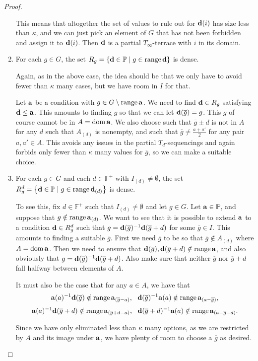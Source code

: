 \documentclass[12pt,a4paper]{article}
\newcommand{\F}{\mathbb{F}}
\DeclareMathOperator{\dom}{dom}
\DeclareMathOperator{\ran}{range}
\newcommand{\st}{\; | \;}
\newcommand{\set}[2]{\left\{#1\st #2 \right\}}
\renewcommand{\P}{\mathbb{P}}
\renewcommand{\a}{\textup{\textbf{a}}}
\newcommand{\g}{\overline{g}}
\renewcommand{\d}{\textup{\textbf{d}}}
\begin{document}
\begin{proof}
\begin{enumerate}
	This means that altogether the set of values to rule out for $\d(i)$ has size less than $\kappa$, and we can just pick an element of \(G\) that has not been forbidden and assign it to \(\d(i)\).
	Then \(\d\) is a partial \(T_\infty\)-terrace with \(i\) in its domain. 
	
	\item For each $g \in G$, the set $R_g=\set{\d \in \P}{g \in \ran \d }$ is dense. 
	
	Again, as in the above case, the idea should be that we only have to avoid fewer than $\kappa$ many cases, but we have room in $I$ for that.
	
	Let $\a$ be a condition with $g \in G \setminus \ran \a$. We need to find $\d \in R_g$ satisfying $\d \leq \a$. This amounts to finding $\g$ so that we can let $\d(\g)=g$.
	This $\g$ of course cannot be in $A=\dom \a$. We also choose such that $\g\pm d$ is not
	in $A$ for any $d$ such that $A_{(d)}$ is nonempty, and such that $\g \neq \frac{a+a'}{2}$ 
	for any pair $a,a'\in A$. This avoids any issues in the partial $T_d$-sequencings and again forbids only fewer than $\kappa$
	many values for $\g$, so we can make a suitable choice. 
		
	\item For each $g \in G$ and each $d \in \F^+$ with $I_{(d)}\neq \emptyset$, the set $R^d_g=\set{\d \in \P}{g \in \ran \d_{(d)}}$ is dense. 
	
	To see this, fix $d \in \F^+$ such that $I_{(d)}\neq \emptyset$ and let $g \in G$. Let $\a \in \P$, and suppose that $g \notin \ran\a_{(d)}$. We want to see that it is possible to extend $\a$ to a condition $\d \in R^d_g$ such that $g=\d(\overline g)^{-1}\d(\overline g+d)$ for some $\overline g \in I$. This amounts to finding a suitable $\overline g$. First we need $\overline g$ to be so that $\overline g \notin A_{(d)}$ where $A = \dom \a$. Then we need to ensure that $\d(\overline g), \d(\overline g+d) \notin \ran \a$, and also obviously that $g=\d(\overline g)^{-1}\d(\overline g+d)$. Also make sure that neither $\g$ nor $\g+d$ fall halfway between elements of $A$.

	It must also be the case that for any $a \in A$, we have that 
		$$\a(a)^{-1}\d(\overline g) \notin \ran \a_{(\overline g-a)}, \ \  \d(\overline{g})^{-1}\a(a) \notin \ran \a_{(a-\overline g)},$$ 
		$$\a(a)^{-1}\d(\overline g+d)  \notin \ran \a_{(\overline g+d-a)}, \ \ \d(\overline g+d)^{-1}\a(a) \notin \ran \a_{(a-\overline g-d)}.$$

		
	Since we have only eliminated less than $\kappa$ many options, as we are restricted by $A$ and its image under $\a$, we have plenty of room to choose a $\overline g$ as desired.


\end{enumerate}
\end{proof}
\end{document}
